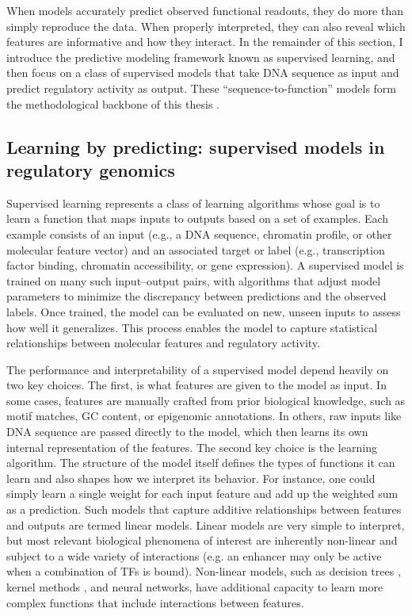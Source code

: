 \begin{dissertationintroduction}
When models accurately predict observed functional readouts, they do more than simply reproduce the data. When properly interpreted, they can also reveal which features are informative and how they interact. In the remainder of this section, I introduce the predictive modeling framework known as supervised learning, and then focus on a class of supervised models that take DNA sequence as input and predict regulatory activity as output. These “sequence-to-function” models form the methodological backbone of this thesis \cite{Sasse2024-ly}.

\subsection{Learning by predicting: supervised models in regulatory genomics}

Supervised learning represents a class of learning algorithms whose goal is to learn a function that maps inputs to outputs based on a set of examples. Each example consists of an input (e.g., a DNA sequence, chromatin profile, or other molecular feature vector) and an associated target or label (e.g., transcription factor binding, chromatin accessibility, or gene expression). A supervised model is trained on many such input–output pairs, with algorithms that adjust model parameters to minimize the discrepancy between predictions and the observed labels. Once trained, the model can be evaluated on new, unseen inputs to assess how well it generalizes. This process enables the model to capture statistical relationships between molecular features and regulatory activity.

The performance and interpretability of a supervised model depend heavily on two key choices. The first, is what features are given to the model as input. In some cases, features are manually crafted from prior biological knowledge, such as motif matches, GC content, or epigenomic annotations. In others, raw inputs like DNA sequence are passed directly to the model, which then learns its own internal representation of the features. The second key choice is the learning algorithm. The structure of the model itself defines the types of functions it can learn and also shapes how we interpret its behavior. For instance, one could simply learn a single weight for each input feature and add up the weighted sum as a prediction. Such models that capture additive relationships between features and outputs are termed linear models. Linear models are very simple to interpret, but most relevant biological phenomena of interest are inherently non-linear and subject to a wide variety of interactions (e.g. an enhancer may only be active when a combination of TFs is bound). Non-linear models, such as decision trees \cite{Rokach2006-hf}, kernel methods \cite{Ghandi2014-hn,Hofmann2007-sl}, and neural networks, have additional capacity to learn more complex functions that include interactions between features. 


\end{dissertationintroduction}
